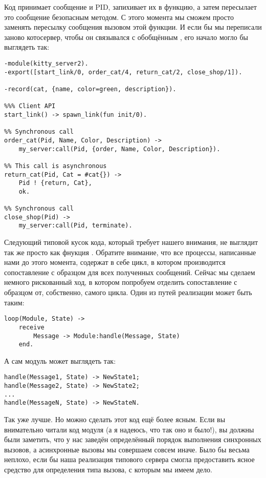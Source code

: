 Код принимает сообщение и PID, запихивает их в функцию, а затем пересылает это сообщение безопасным методом.
С этого момента мы сможем просто заменять пересылку сообщения вызовом этой функции.
И если бы мы переписали заново котосервер, чтобы он связывался с обобщённым , его начало могло бы выглядеть так:
\begin{lstlisting}[style=erlang]
-module(kitty_server2).
-export([start_link/0, order_cat/4, return_cat/2, close_shop/1]).
 
-record(cat, {name, color=green, description}).
 
%%% Client API
start_link() -> spawn_link(fun init/0).
 
%% Synchronous call
order_cat(Pid, Name, Color, Description) ->
    my_server:call(Pid, {order, Name, Color, Description}).
 
%% This call is asynchronous
return_cat(Pid, Cat = #cat{}) ->
    Pid ! {return, Cat},
    ok.
 
%% Synchronous call
close_shop(Pid) ->
    my_server:call(Pid, terminate).
\end{lstlisting}
Следующий типовой кусок кода, который требует нашего внимания, не выглядит так же просто как фнукция .
Обратите внимание, что все процессы, написанные нами до этого момента, содержат в себе цикл, в котором производится сопоставление с образцом для всех полученных сообщений.
Сейчас мы сделаем немного рискованный ход, в котором попробуем отделить сопоставление с образцом от, собственно, самого цикла.
Один из путей реализации может быть таким:
\begin{lstlisting}[style=erlang]
loop(Module, State) ->
    receive
        Message -> Module:handle(Message, State)
    end.
\end{lstlisting}

А сам модуль может выглядеть так:
\begin{lstlisting}[style=erlang]
handle(Message1, State) -> NewState1;
handle(Message2, State) -> NewState2;
...
handle(MessageN, State) -> NewStateN.
\end{lstlisting}
Так уже лучше.
Но можно сделать этот код ещё более ясным.
Если вы внимательно читали код модуля  (а я надеюсь, что так оно и было!), вы должны были заметить, что у нас заведён определённый порядок выполнения синхронных вызовов, а асинхронные вызовы мы совершаем совсем иначе.
Было бы весьма неплохо, если бы наша реализация типового сервера смогла предоставить ясное средство для определения типа вызова, с которым мы имеем дело.

